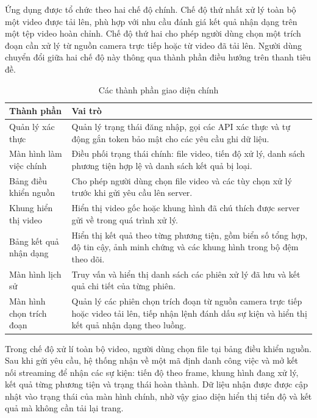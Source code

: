 \documentclass[../DoAn.tex]{subfiles}
\begin{document}
Ứng dụng được tổ chức theo hai chế độ chính. Chế độ thứ nhất xử lý toàn bộ một video được tải lên, phù hợp với nhu cầu đánh giá kết quả nhận dạng trên một tệp video hoàn chỉnh. Chế độ thứ hai cho phép người dùng chọn một trích đoạn cần xử lý từ nguồn camera trực tiếp hoặc từ video đã tải lên. Người dùng chuyển đổi giữa hai chế độ này thông qua thành phần điều hướng trên thanh tiêu đề.

\begin{table}[htbp]
\centering
\renewcommand{\arraystretch}{1.15}
\begin{tabular}{|p{3.8cm}|p{9.6cm}|}
\hline
\textbf{Thành phần} & \textbf{Vai trò} \\ \hline
Quản lý xác thực & Quản lý trạng thái đăng nhập, gọi các API xác thực và tự động gắn token bảo mật cho các yêu cầu ghi dữ liệu. \\ \hline
Màn hình làm việc chính & Điều phối trạng thái chính: file video, tiến độ xử lý, danh sách phương tiện hợp lệ và danh sách kết quả bị loại. \\ \hline
Bảng điều khiển nguồn & Cho phép người dùng chọn file video và các tùy chọn xử lý trước khi gửi yêu cầu lên server. \\ \hline
Khung hiển thị video & Hiển thị video gốc hoặc khung hình đã chú thích được server gửi về trong quá trình xử lý. \\ \hline
Bảng kết quả nhận dạng & Hiển thị kết quả theo từng phương tiện, gồm biển số tổng hợp, độ tin cậy, ảnh minh chứng và các khung hình trong bộ đệm theo dõi. \\ \hline
Màn hình lịch sử & Truy vấn và hiển thị danh sách các phiên xử lý đã lưu và kết quả chi tiết của từng phiên. \\ \hline
Màn hình chọn trích đoạn & Quản lý các phiên chọn trích đoạn từ nguồn camera trực tiếp hoặc video tải lên, tiếp nhận lệnh đánh dấu sự kiện và hiển thị kết quả nhận dạng theo luồng. \\ \hline
\end{tabular}
\caption{Các thành phần giao diện chính}
\label{table:frontend_components}
\end{table}

Trong chế độ xử lí toàn bộ video, người dùng chọn file tại bảng điều khiển nguồn. Sau khi gửi yêu cầu, hệ thống nhận về một mã định danh công việc và mở kết nối streaming để nhận các sự kiện: tiến độ theo frame, khung hình đang xử lý, kết quả từng phương tiện và trạng thái hoàn thành. Dữ liệu nhận được được cập nhật vào trạng thái của màn hình chính, nhờ vậy giao diện hiển thị tiến độ và kết quả mà không cần tải lại trang.
\end{document}
